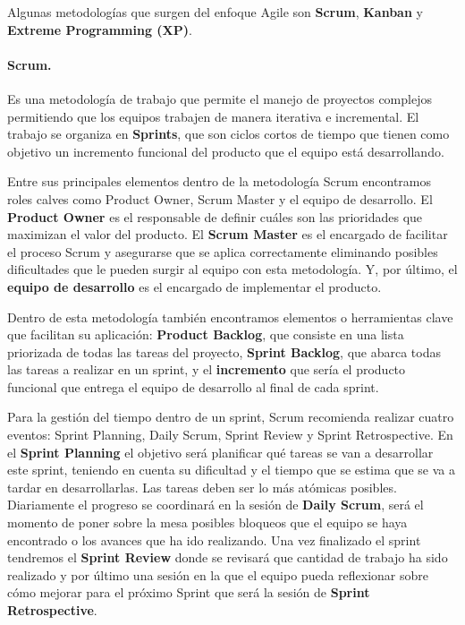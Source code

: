 Algunas metodologías que surgen del enfoque Agile son \textbf{Scrum}, \textbf{Kanban} y \textbf{Extreme Programming (XP)}.

\paragraph{Scrum.} Es una metodología de trabajo que permite el manejo de proyectos complejos permitiendo que los equipos trabajen de manera iterativa e incremental. El trabajo se organiza en \textbf{Sprints}, que son ciclos cortos de tiempo que tienen como objetivo un incremento funcional del producto que el equipo está desarrollando.\cite{scrum}

Entre sus principales elementos dentro de la metodología Scrum encontramos roles calves como Product Owner, Scrum Master y el equipo de desarrollo. El \textbf{Product Owner} es el responsable de definir cuáles son las prioridades que maximizan el valor del producto. El \textbf{Scrum Master} es el encargado de facilitar el proceso Scrum y asegurarse que se aplica correctamente eliminando posibles dificultades que le pueden surgir al equipo con esta metodología. Y, por último, el \textbf{equipo de desarrollo} es el encargado de implementar el producto.

Dentro de esta metodología también encontramos elementos o herramientas clave que facilitan su aplicación: \textbf{Product Backlog}, que consiste en una lista priorizada de todas las tareas del proyecto, \textbf{Sprint Backlog}, que abarca todas las tareas a realizar en un sprint, y el \textbf{incremento} que sería el producto funcional que entrega el equipo de desarrollo al final de cada sprint.

Para la gestión del tiempo dentro de un sprint, Scrum recomienda realizar cuatro eventos: Sprint Planning, Daily Scrum, Sprint Review y Sprint Retrospective. En el \textbf{Sprint Planning} el objetivo será planificar qué tareas se van a desarrollar este sprint, teniendo en cuenta su dificultad y el tiempo que se estima que se va a tardar en desarrollarlas. Las tareas deben ser lo más atómicas posibles. Diariamente el progreso se coordinará en la sesión de \textbf{Daily Scrum}, será el momento de poner sobre la mesa posibles bloqueos que el equipo se haya encontrado o los avances que ha ido realizando. Una vez finalizado el sprint tendremos el \textbf{Sprint Review} donde se revisará que cantidad de trabajo ha sido realizado y por último una sesión en la que el equipo pueda reflexionar sobre cómo mejorar para el próximo Sprint que será la sesión de \textbf{Sprint Retrospective}.

